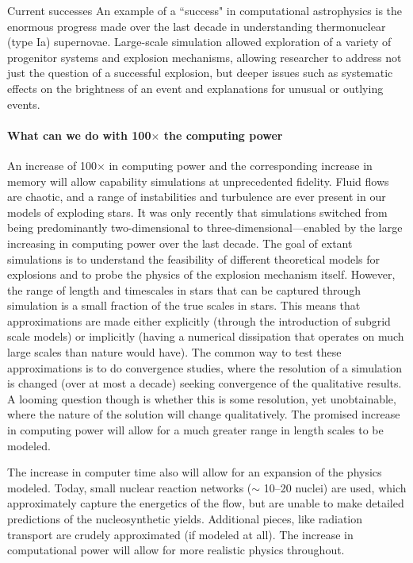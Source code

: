 \documentclass[11pt]{article}
\begin{document}
Current successes
An example of a ``success" in computational astrophysics is the
enormous progress made over the last decade in understanding 
thermonuclear (type Ia) supernovae. Large-scale simulation 
allowed exploration of a variety of progenitor systems and
explosion mechanisms, allowing researcher to address not
just the question of a successful explosion, but deeper issues such
as systematic effects on the brightness of an event and explanations
for unusual or outlying events.

\paragraph*{What can we do with 100$\times$ the computing power}

An increase of 100$\times$ in computing power and the corresponding
increase in memory will allow capability simulations at unprecedented
fidelity. Fluid flows are chaotic, and a range of instabilities and 
turbulence are ever present in our models of exploding stars. It 
was only recently that simulations switched from being predominantly
two-dimensional to three-dimensional---enabled by the large increasing
in computing power over the last decade.  The goal of extant
simulations is to understand the feasibility of different theoretical
models for explosions and to probe the physics of the explosion
mechanism itself.  However, the range of length and timescales in
stars that can be captured through simulation is a small fraction of
the true scales in stars.  This means that approximations are made
either explicitly (through the introduction of subgrid scale models)
or implicitly (having a numerical dissipation that operates on much
large scales than nature would have).  The common way to test these
approximations is to do convergence studies, where the resolution of a
simulation is changed (over at most a decade) seeking convergence of
the qualitative results.  A looming question though is whether this is
some resolution, yet unobtainable, where the nature of the solution
will change qualitatively.  The promised increase in computing power
will allow for a much greater range in length scales to be modeled.

The increase in computer time also will allow for an expansion of the
physics modeled.  Today, small nuclear reaction networks ($\sim$
10--20 nuclei) are used, which approximately capture the energetics of
the flow, but are unable to make detailed predictions of the
nucleosynthetic yields.  Additional pieces, like radiation transport
are crudely approximated (if modeled at all).  The increase in
computational power will allow for more realistic physics throughout.
\end{document}
